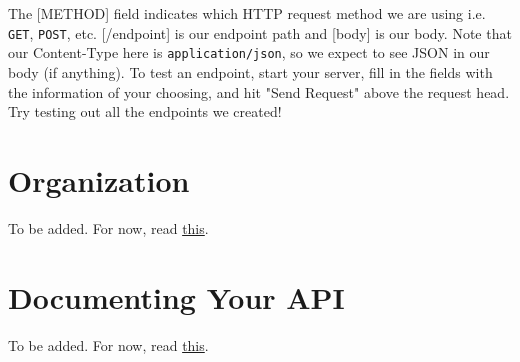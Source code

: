 The [METHOD] field indicates which HTTP request method we are using i.e. \texttt{GET}, \texttt{POST}, etc. [/endpoint] is our endpoint path and [body] is our body. Note that our Content-Type here is \texttt{application/json}, so we expect to see JSON in our body (if anything). To test an endpoint, start your server, fill in the fields with the information of your choosing, and hit "Send Request" above the request head. Try testing out all the endpoints we created!

\section{Organization}
To be added. For now, read \href{https://blog.logrocket.com/organizing-express-js-project-structure-better-productivity}{this}.
\section{Documenting Your API}
To be added. For now, read \href{https://swagger.io/solutions/api-documentation/}{this}.

